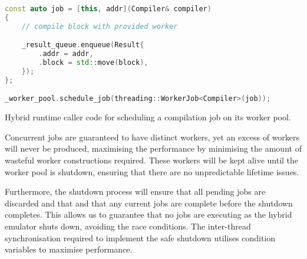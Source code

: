 \begin{lstfloat}[H]
    \begin{lstlisting}[language=c++]
const auto job = [this, addr](Compiler& compiler)
{
    // compile block with provided worker

    _result_queue.enqueue(Result{
        .addr = addr,
        .block = std::move(block),
    });
};

_worker_pool.schedule_job(threading::WorkerJob<Compiler>(job));
    \end{lstlisting}
    \caption{Hybrid runtime caller code for scheduling a compilation job on its worker pool.}
    \label{code:schedule-job-worker}
\end{lstfloat}

Concurrent jobs are guaranteed to have distinct workers, yet an excess of workers will never be produced, maximising the performance by minimising the amount of wasteful worker constructions required. These workers will be kept alive until the worker pool is shutdown, ensuring that there are no unpredictable lifetime issues.

Furthermore, the shutdown process will ensure that all pending jobs are discarded and that and that any current jobs are complete before the shutdown completes. This allows us to guarantee that no jobs are executing as the hybrid emulator shuts down, avoiding the race conditions. The inter-thread synchronisation required to implement the safe shutdown utilises condition variables to maximise performance.